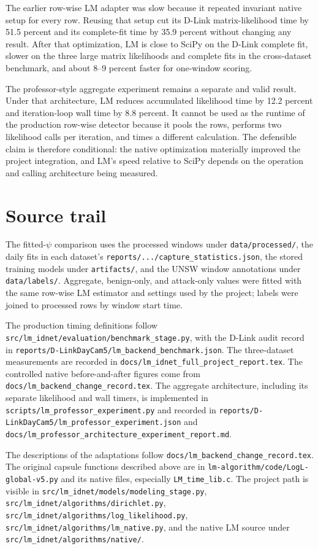 \documentclass[11pt]{article}
\begin{document}
The earlier row-wise LM adapter was slow because it repeated invariant native
setup for every row. Reusing that setup cut its D-Link matrix-likelihood time
by 51.5 percent and its complete-fit time by 35.9 percent without changing any
result. After that optimization, LM is close to SciPy on the D-Link complete
fit, slower on the three large matrix likelihoods and complete fits in the
cross-dataset benchmark, and about 8--9 percent faster for one-window scoring.

The professor-style aggregate experiment remains a separate and valid result.
Under that architecture, LM reduces accumulated likelihood time by 12.2
percent and iteration-loop wall time by 8.8 percent. It cannot be used as the
runtime of the production row-wise detector because it pools the rows, performs
two likelihood calls per iteration, and times a different calculation. The
defensible claim is therefore conditional: the native optimization materially
improved the project integration, and LM's speed relative to SciPy depends on
the operation and calling architecture being measured.

\section*{Source trail}

The fitted-\(\psi\) comparison uses the processed windows under
\texttt{data/processed/}, the daily fits in each dataset's
\texttt{reports/.../capture\_statistics.json}, the stored training models
under \texttt{artifacts/}, and the UNSW window annotations under
\texttt{data/labels/}. Aggregate, benign-only, and attack-only values were
fitted with the same row-wise LM estimator and settings used by the project;
labels were joined to processed rows by window start time.

The production timing definitions follow
\texttt{src/lm\_idnet/evaluation/benchmark\_stage.py}, with the D-Link audit
record in \texttt{reports/D-LinkDayCam5/lm\_backend\_benchmark.json}. The
three-dataset measurements are recorded in
\texttt{docs/lm\_idnet\_full\_project\_report.tex}. The controlled native
before-and-after figures come from
\texttt{docs/lm\_backend\_change\_record.tex}. The aggregate architecture,
including its separate likelihood and wall timers, is implemented in
\texttt{scripts/lm\_professor\_experiment.py} and recorded in
\texttt{reports/D-LinkDayCam5/lm\_professor\_experiment.json} and
\texttt{docs/lm\_professor\_architecture\_experiment\_report.md}.

The descriptions of the adaptations follow
\texttt{docs/lm\_backend\_change\_record.tex}. The original capsule functions
described above are in \texttt{lm-algorithm/code/LogL-global-v5.py} and its
native files, especially \texttt{LM\_time\_lib.c}. The project path is visible
in \texttt{src/lm\_idnet/models/modeling\_stage.py},
\texttt{src/lm\_idnet/algorithms/dirichlet.py},
\texttt{src/lm\_idnet/algorithms/log\_likelihood.py},
\texttt{src/lm\_idnet/algorithms/lm\_native.py}, and the native LM source
under \texttt{src/lm\_idnet/algorithms/native/}.
\end{document}

